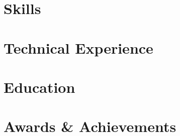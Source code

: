 \documentclass[letter,10pt]{article}
\begin{document}


\section{Skills}


\section{Technical Experience}


\section{Education}



\section{Awards \& Achievements}

\end{document}
